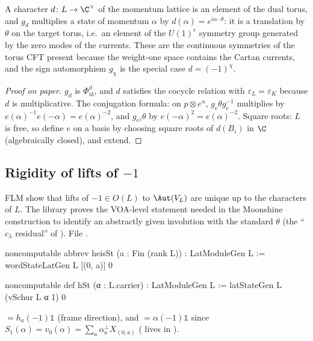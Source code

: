 \begin{physics}
A character $d\colon L\to\C^\times$ of the momentum lattice is an element of the dual torus, and $g_d$ multiplies a state of momentum $\alpha$ by $d(\alpha)=e^{i\alpha\cdot\theta}$: it is a translation by $\theta$ on the target torus, i.e.\ an element of the $U(1)^r$ symmetry group generated by the zero modes of the currents. These are the continuous symmetries of the torus CFT present because the weight-one space contains the Cartan currents, and the sign automorphism $g_\chi$ is the special case $d=(-1)^\chi$.
\end{physics}
\begin{proof}[Proof on paper]
$g_d$ is $\Phi^{d}_{\mathrm{id}}$, and $d$ satisfies the cocycle relation with $\varepsilon_L=
\varepsilon_K$ because $d$ is multiplicative. The conjugation formula: on $p\otimes e^\alpha$,
$g_e\theta g_e^{-1}$ multiplies by $e(\alpha)^{-1}e(-\alpha)=e(\alpha)^{-2}$, and $g_{e^2}\theta$
by $e(-\alpha)^2=e(\alpha)^{-2}$. Square roots: $L$ is free, so define $e$ on a basis by choosing
square roots of $d(B_i)$ in $\C$ (algebraically closed), and extend.
\end{proof}

\subsection{Rigidity of lifts of \texorpdfstring{$-1$}{-1}}\label{ch03:sec:rigidity}

FLM show that lifts of $-1\in O(L)$ to $\Aut(V_L)$ are unique up to the characters of $L$. The
library proves the VOA-level statement needed in the Moonshine construction to identify an
abstractly given involution with the standard $\theta$ (the ``$c_\lambda$ residual'' of
).
\noindent File .
\begin{leancode}
noncomputable abbrev heisSt (a : Fin (rank L)) : LatModuleGen L := wordStateLatGen L [(0, a)] 0

noncomputable def hSt (α : L.carrier) : LatModuleGen L := latStateGen L (vSchur L α 1) 0
\end{leancode}
 $=h_a(-1)\mathbb 1$ (frame direction), and  $=\alpha(-1)\mathbb 1$
since $S_1(\alpha)=v_0(\alpha)=\sum_a\alpha^\perp_aX_{(0,a)}$ ( lives in
).


